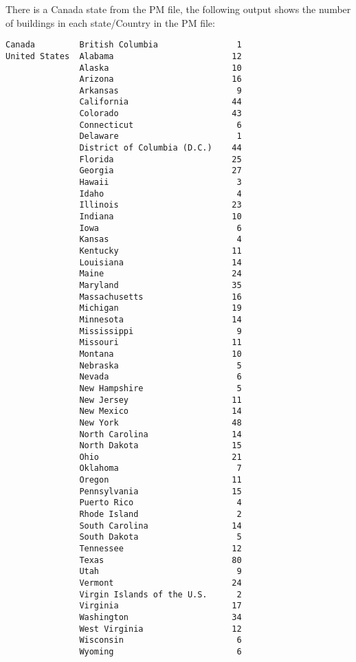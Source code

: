 \documentclass[12pt]{article}
\begin{document}
There is a Canada state from the PM file, the following output shows
the number of buildings in each state/Country in the PM file:
\begin{verbatim}
Canada         British Columbia                1
United States  Alabama                        12
               Alaska                         10
               Arizona                        16
               Arkansas                        9
               California                     44
               Colorado                       43
               Connecticut                     6
               Delaware                        1
               District of Columbia (D.C.)    44
               Florida                        25
               Georgia                        27
               Hawaii                          3
               Idaho                           4
               Illinois                       23
               Indiana                        10
               Iowa                            6
               Kansas                          4
               Kentucky                       11
               Louisiana                      14
               Maine                          24
               Maryland                       35
               Massachusetts                  16
               Michigan                       19
               Minnesota                      14
               Mississippi                     9
               Missouri                       11
               Montana                        10
               Nebraska                        5
               Nevada                          6
               New Hampshire                   5
               New Jersey                     11
               New Mexico                     14
               New York                       48
               North Carolina                 14
               North Dakota                   15
               Ohio                           21
               Oklahoma                        7
               Oregon                         11
               Pennsylvania                   15
               Puerto Rico                     4
               Rhode Island                    2
               South Carolina                 14
               South Dakota                    5
               Tennessee                      12
               Texas                          80
               Utah                            9
               Vermont                        24
               Virgin Islands of the U.S.      2
               Virginia                       17
               Washington                     34
               West Virginia                  12
               Wisconsin                       6
               Wyoming                         6
\end{verbatim}
\end{document}
